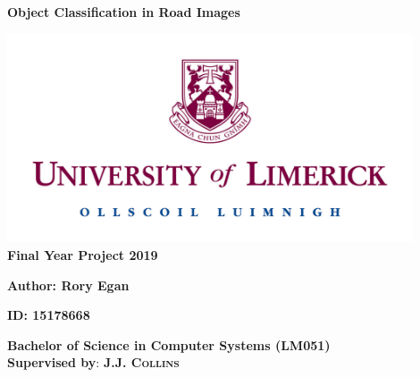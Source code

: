 \documentclass[12pt]{report}
\begin{document}
 \begin{titlepage}
   \begin{center}
        \vspace*{0.5cm}

        \begin{Huge}
        \textbf{Object Classification in Road Images}
        \end{Huge}
        
        \vspace{0.5cm}
        \includegraphics[width=12cm]{ul} \\
    	
    	\normalsize
        \vspace{1.5cm}
        \textbf{Final Year Project 2019} 
        
        \vspace{0.5cm}
        \textbf{Author: Rory Egan}
        
        \vspace{0.5cm}
        \textbf{ID: 15178668}
 
        \vfill
        \textbf{Bachelor of Science in Computer Systems (LM051)} \\
        \normalsize
        \vspace{0.5cm}
        \textbf{Supervised by}: \textsc{\textbf{J.J. Collins}}
 
  \end{center}
 \end{titlepage}
 
\end{document}
